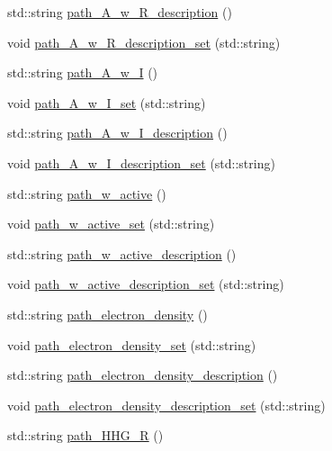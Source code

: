 \begin{DoxyCompactItemize}
\item 
std\+::string \hyperlink{class_config___settings_ace32bd1bab46df76c0ed956a18ce61ae}{path\+\_\+\+A\+\_\+w\+\_\+\+R\+\_\+description} ()
\item 
void \hyperlink{class_config___settings_a094737566f0c26056d5a478c3f5f378e}{path\+\_\+\+A\+\_\+w\+\_\+\+R\+\_\+description\+\_\+set} (std\+::string)
\item 
std\+::string \hyperlink{class_config___settings_a7762e9c9b562a280043f9f63847889da}{path\+\_\+\+A\+\_\+w\+\_\+I} ()
\item 
void \hyperlink{class_config___settings_a66c97e326afdb09278a54a7a1fa9f839}{path\+\_\+\+A\+\_\+w\+\_\+\+I\+\_\+set} (std\+::string)
\item 
std\+::string \hyperlink{class_config___settings_abb331f84c9b15ce72658033b397dea6b}{path\+\_\+\+A\+\_\+w\+\_\+\+I\+\_\+description} ()
\item 
void \hyperlink{class_config___settings_af21282b6d9e0b1dbd70b37c588eb59ce}{path\+\_\+\+A\+\_\+w\+\_\+\+I\+\_\+description\+\_\+set} (std\+::string)
\item 
std\+::string \hyperlink{class_config___settings_a9cfa4af65050ec56395bb7a68c1cdb56}{path\+\_\+w\+\_\+active} ()
\item 
void \hyperlink{class_config___settings_afe55b833700a75e7c061ffe1a6de6cb3}{path\+\_\+w\+\_\+active\+\_\+set} (std\+::string)
\item 
std\+::string \hyperlink{class_config___settings_a88454d1faa079b5fbcb1c8ed6e8a5887}{path\+\_\+w\+\_\+active\+\_\+description} ()
\item 
void \hyperlink{class_config___settings_a2bcc8409da0d646c51a6a10930b25076}{path\+\_\+w\+\_\+active\+\_\+description\+\_\+set} (std\+::string)
\item 
std\+::string \hyperlink{class_config___settings_af9012a39fcba1d28f740c459e4715ac5}{path\+\_\+electron\+\_\+density} ()
\item 
void \hyperlink{class_config___settings_a3022b35eb8216b146cc7a29bdf722a89}{path\+\_\+electron\+\_\+density\+\_\+set} (std\+::string)
\item 
std\+::string \hyperlink{class_config___settings_a81ea2d6d1fa946492fb2d2f096f6b152}{path\+\_\+electron\+\_\+density\+\_\+description} ()
\item 
void \hyperlink{class_config___settings_a299b27ad3646f8d62cb66ec96586cc6c}{path\+\_\+electron\+\_\+density\+\_\+description\+\_\+set} (std\+::string)
\item 
std\+::string \hyperlink{class_config___settings_a992a09a487838b210d096818158a1493}{path\+\_\+\+H\+H\+G\+\_\+R} ()

\end{DoxyCompactItemize}
